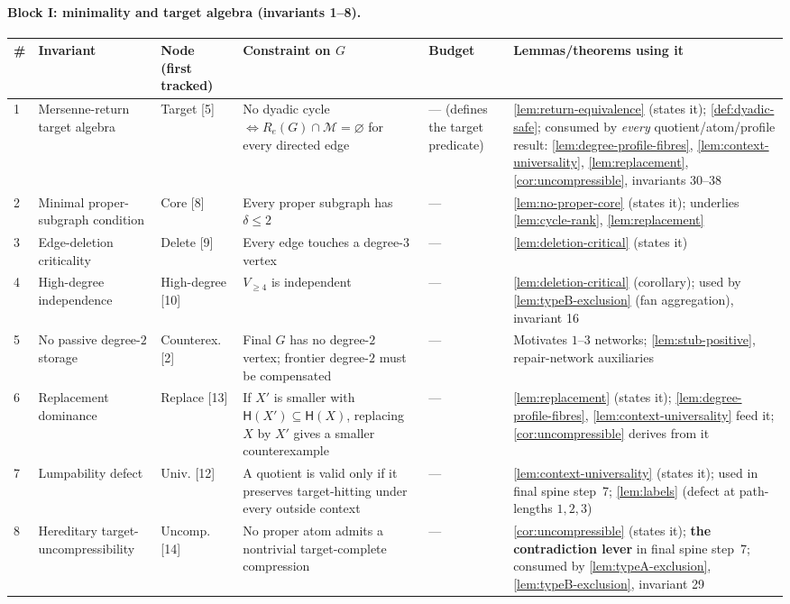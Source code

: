 \documentclass[11pt]{article}
\newcommand{\Mers}{\mathcal M}
\newcommand{\profile}{\mathsf H}
\begin{document}
\paragraph{Block I: minimality and target algebra (invariants 1--8).}
{\scriptsize\setlength{\tabcolsep}{3pt}
\begin{longtable}{C{0.022\textwidth} L{0.135\textwidth} L{0.115\textwidth} L{0.235\textwidth} L{0.085\textwidth} L{0.29\textwidth}}
\toprule
\textbf{\#} & \textbf{Invariant} & \textbf{Node (first tracked)} & \textbf{Constraint on $G$} & \textbf{Budget} & \textbf{Lemmas/theorems using it} \\
\midrule
{} & Mersenne-return target algebra & Target {[5]} & No dyadic cycle $\iff R_e(G)\cap\Mers=\varnothing$ for every directed edge & --- (defines the target predicate) & \cref{lem:return-equivalence} (states it); \cref{def:dyadic-safe}; consumed by \emph{every} quotient/atom/profile result: \cref{lem:degree-profile-fibres}, \cref{lem:context-universality}, \cref{lem:replacement}, \cref{cor:uncompressible}, invariants 30--38 \\
2 & Minimal proper-subgraph condition & Core {[8]} & Every proper subgraph has $\delta\le2$ & --- & \cref{lem:no-proper-core} (states it); underlies \cref{lem:cycle-rank}, \cref{lem:replacement} \\
3 & Edge-deletion criticality & Delete {[9]} & Every edge touches a degree-$3$ vertex & --- & \cref{lem:deletion-critical} (states it) \\
4 & High-degree independence & High-degree {[10]} & $V_{\ge4}$ is independent & --- & \cref{lem:deletion-critical} (corollary); used by \cref{lem:typeB-exclusion} (fan aggregation), invariant 16 \\
5 & No passive degree-$2$ storage & Counterex. {[2]} & Final $G$ has no degree-$2$ vertex; frontier degree-$2$ must be compensated & --- & Motivates $1$--$3$ networks; \cref{lem:stub-positive}, repair-network auxiliaries \\
6 & Replacement dominance & Replace {[13]} & If $X'$ is smaller with $\profile(X')\subseteq\profile(X)$, replacing $X$ by $X'$ gives a smaller counterexample & --- & \cref{lem:replacement} (states it); \cref{lem:degree-profile-fibres}, \cref{lem:context-universality} feed it; \cref{cor:uncompressible} derives from it \\
7 & Lumpability defect & Univ. {[12]} & A quotient is valid only if it preserves target-hitting under every outside context & --- & \cref{lem:context-universality} (states it); used in final spine step~7; \cref{lem:labels} (defect at path-lengths $1,2,3$) \\
8 & Hereditary target-uncompressibility & Uncomp. {[14]} & No proper atom admits a nontrivial target-complete compression & --- & \cref{cor:uncompressible} (states it); \textbf{the contradiction lever} in final spine step~7; consumed by \cref{lem:typeA-exclusion}, \cref{lem:typeB-exclusion}, invariant 29 \\
\bottomrule
\end{longtable}
}
\end{document}
